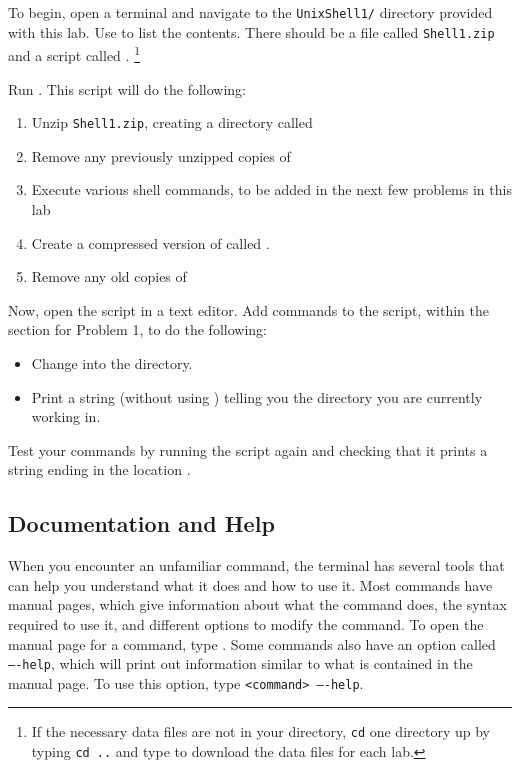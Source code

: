 \begin{problem}
To begin, open a terminal and navigate to the \texttt{UnixShell1/} directory provided with this lab.
Use  to list the contents.
There should be a file called \texttt{Shell1.zip} and a script called .
\footnote{If the necessary data files are not in your directory, \texttt{cd} one directory up by typing \texttt{cd ..} and type \footnotesize{} to download the data files for each lab.}

Run .
This script will do the following:
\begin{enumerate}
	\item Unzip \texttt{Shell1.zip}, creating a directory called 
	\item Remove any previously unzipped copies of 
	\item Execute various shell commands, to be added in the next few problems in this lab
	\item Create a compressed version of  called .
	\item Remove any old copies of 
\end{enumerate}

Now, open the  script in a text editor.
Add commands to the script, within the section for Problem 1, to do the following:
\begin{itemize}
	\item Change into the  directory.
	\item Print a string (without using ) telling you the directory you are currently working in.
\end{itemize}

Test your commands by running the script again and checking that it prints a string ending in the location .
\label{problem:basic-commands}
\end{problem}

\subsection*{Documentation and Help} %
When you encounter an unfamiliar command, the terminal has several tools that can help you understand what it does and how to use it.
Most commands have manual pages, which give information about what the command does, the syntax required to use it, and different options to modify the command.
To open the manual page for a command, type .
Some commands also have an option called \texttt{----help}, which will print out information similar to what is contained in the manual page.
To use this option, type \texttt{<command> ----help}.

